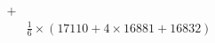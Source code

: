 \documentclass[preview]{standalone}
\begin{document}
\begin{align*}
+&\\&\frac{1}{6}\times(17110+4\times16881+16832)
\end{align*}
\end{document}
